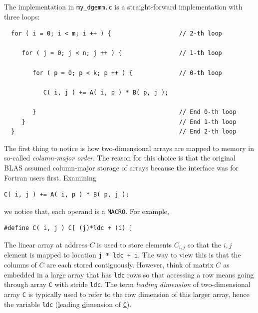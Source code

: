 The implementation in {\tt my\_dgemm.c} is a straight-forward implementation with three loops:
\begin{verbatim}
  for ( i = 0; i < m; i ++ ) {                   // 2-th loop
  
     for ( j = 0; j < n; j ++ ) {                // 1-th loop
  
        for ( p = 0; p < k; p ++ ) {             // 0-th loop
  
           C( i, j ) += A( i, p ) * B( p, j );
  
        }                                        // End 0-th loop
     }                                           // End 1-th loop
  }                                              // End 2-th loop
\end{verbatim}
The first thing to notice is how two-dimensional arrays are mapped to memory in so-called {\em column-major order}.  The reason for this choice is that the original BLAS assumed column-major storage of arrays because the interface was for Fortran users first.  
Examining
\begin{verbatim}
C( i, j ) += A( i, p ) * B( p, j );
\end{verbatim}
we notice that, each operand is a {\tt MACRO}. For example,
\begin{verbatim}
#define C( i, j ) C[ (j)*ldc + (i) ]
\end{verbatim}
The linear array at address $ C $ is used to store elements $ C_{i,j} $ so that the $ i,j $ element is mapped to location {\tt j * ldc + i}.  The way to view this is that the columns of $ C $ are each stored contiguously.  However, think of matrix $ C $ as embedded in a large array that has {\tt ldc} rows so that accessing a row means going through array {\tt C} with stride {\tt ldc}.  The term {\em leading dimension} of two-dimensional array {\tt C} is typically used to refer to the row dimension of this larger array, hence the variable {\tt ldc} (\underline{l}eading \underline{d}imension of \underline{\tt C}).


